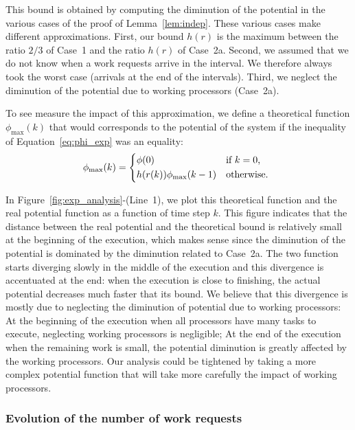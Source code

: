 This bound is obtained by computing the diminution of the potential in
the various cases of the proof of Lemma~\ref{lem:indep}.  These various
cases make different approximations. First, our bound $h(r)$ is the
maximum between the ratio $2/3$ of Case~1 and the 
ratio $h(r)$ of Case~2a. Second, we assumed that we do not know when a
work requests arrive in the interval.  We therefore always took the
worst case (arrivals at the end of the intervals). Third, we neglect
the diminution of the potential due to working processors (Case~2a).

To see measure the impact of this approximation, we define a
theoretical function $\phi_{\max}(k)$ that would corresponds to the
potential of the system if the inequality of
Equation~\eqref{eq:phi_exp} was an equality:
\begin{equation}
  \label{eq:phi_max}
  \phi_{\max}(k) =
  \begin{cases*}
    \phi(0) & if $k = 0$, \\
    h(r(k))\phi_{\max}(k-1)        & otherwise.
  \end{cases*}
\end{equation}

In Figure~\ref{fig:exp_analysis}-(Line~1), we plot this theoretical
function and the real potential function as a function of time step
$k$. This figure indicates that the distance between the real
potential and the theoretical bound is relatively small at the
beginning of the execution, which makes sense since the diminution of
the potential is dominated by the diminution related to Case~2a. The
two function starts diverging slowly in the middle of the execution
and this divergence is accentuated at the end: when the execution is
close to finishing, the actual potential decreases much faster that
its bound. We believe that this divergence is mostly due to neglecting
the diminution of potential due to working processors: At the
beginning of the execution when all processors have many tasks to
execute, neglecting working processors is negligible; At the end of the
execution when the remaining work is small, the potential diminution
is greatly affected by the working processors.  Our analysis could be
tightened by taking a more complex potential function that will take
more carefully the impact of working processors.

\subsubsection{Evolution of the number of work requests}

